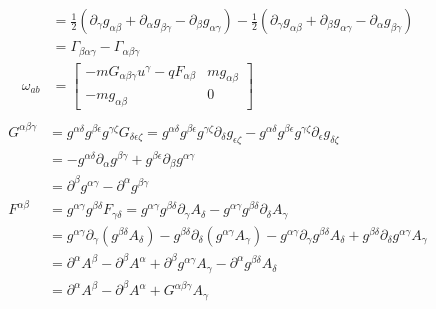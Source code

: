 \documentclass[11pt]{article}
\begin{document}
\begin{equation}
\begin{aligned}
&= \frac{1}{2} (\partial_\gamma g_{\alpha \beta} + \partial_\alpha g_{\beta \gamma} - \partial_\beta g_{\alpha \gamma}) - \frac{1}{2} (\partial_\gamma g_{\alpha \beta} + \partial_\beta g_{\alpha \gamma} - \partial_\alpha g_{\beta \gamma}) \\
&= \Gamma_{\beta\alpha\gamma} - \Gamma_{\alpha\beta\gamma} \\
\omega_{ab} &= \left[ \begin{matrix}
- m G_{\alpha\beta\gamma} u^\gamma - q F_{\alpha\beta} & mg_{\alpha \beta} \\[2.2ex]
- mg_{\alpha \beta} & 0 \end{matrix} \right] \\
\end{aligned}
\end{equation}
\begin{equation}
\begin{aligned}
G^{\alpha\beta\gamma} &= g^{\alpha\delta}g^{\beta\epsilon}g^{\gamma\zeta} G_{\delta\epsilon\zeta} = g^{\alpha\delta}g^{\beta\epsilon}g^{\gamma\zeta} \partial_\delta g_{\epsilon\zeta} - g^{\alpha\delta}g^{\beta\epsilon}g^{\gamma\zeta} \partial_\epsilon g_{\delta\zeta}\\
&= - g^{\alpha\delta} \partial_\alpha g^{\beta\gamma} + g^{\beta\epsilon} \partial_\beta g^{\alpha\gamma} \\
&= \partial^\beta g^{\alpha\gamma} - \partial^\alpha g^{\beta\gamma} \\
F^{\alpha\beta} &= g^{\alpha\gamma}g^{\beta\delta} F_{\gamma\delta} = g^{\alpha\gamma}g^{\beta\delta} \partial_\gamma A_{\delta} - g^{\alpha\gamma}g^{\beta\delta} \partial_\delta A_{\gamma}  \\
&= g^{\alpha\gamma} \partial_\gamma (g^{\beta\delta} A_{\delta}) - g^{\beta\delta} \partial_\delta ( g^{\alpha\gamma}A_{\gamma}) - g^{\alpha\gamma} \partial_\gamma g^{\beta\delta} A_{\delta} + g^{\beta\delta} \partial_\delta g^{\alpha\gamma}A_{\gamma}\\
&= \partial^\alpha A^\beta - \partial^\beta A^\alpha + \partial ^\beta g^{\alpha \gamma} A_\gamma - \partial^\alpha g^{\beta \delta} A_\delta\\
&= \partial^\alpha A^\beta - \partial^\beta A^\alpha +G^{\alpha\beta\gamma} A_\gamma
\end{aligned}
\end{equation}
\end{document}
